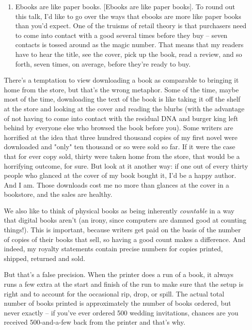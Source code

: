 \begin{enumerate}
\item
  Ebooks are like paper books. [Ebooks are like paper books]. To
  round out this talk, I'd like to go over the ways that ebooks are
  more like paper books than you'd expect. One of the truisms of
  retail theory is that purchasers need to come into contact with a
  good several times before they buy -- seven contacts is tossed
  around as the magic number. That means that my readers have to hear
  the title, see the cover, pick up the book, read a review, and so
  forth, seven times, on average, before they're ready to buy.
\end{enumerate}
There's a temptation to view downloading a book as comparable to
bringing it home from the store, but that's the wrong metaphor.
Some of the time, maybe most of the time, downloading the text of
the book is like taking it off the shelf at the store and looking
at the cover and reading the blurbs (with the advantage of not
having to come into contact with the residual DNA and burger king
left behind by everyone else who browsed the book before you). Some
writers are horrified at the idea that three hundred thousand
copies of my first novel were downloaded and "only" ten thousand or
so were sold so far. If it were the case that for ever copy sold,
thirty were taken home from the store, that would be a horrifying
outcome, for sure. But look at it another way: if one out of every
thirty people who glanced at the cover of my book bought it, I'd be
a happy author. And I am. Those downloads cost me no more than
glances at the cover in a bookstore, and the sales are healthy.

We also like to think of physical books as being inherently
\emph{countable} in a way that digital books aren't (an irony,
since computers are damned good at counting things!). This is
important, because writers get paid on the basis of the number of
copies of their books that sell, so having a good count makes a
difference. And indeed, my royalty statements contain precise
numbers for copies printed, shipped, returned and sold.

But that's a false precision. When the printer does a run of a
book, it always runs a few extra at the start and finish of the run
to make sure that the setup is right and to account for the
occasional rip, drop, or spill. The actual total number of books
printed is approximately the number of books ordered, but never
exactly -- if you've ever ordered 500 wedding invitations, chances
are you received 500-and-a-few back from the printer and that's
why.

